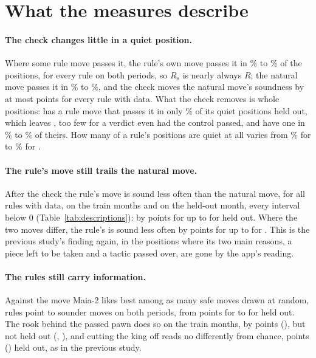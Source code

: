 \documentclass[11pt]{article}
\begin{document}
\ControlTable

\section{What the measures describe}

\paragraph{The check changes little in a quiet position.} Where some rule move passes it, the rule's
own move passes it in \RsRLow\% to \RsRHigh\% of the positions, for every rule on both periods, so
$R_s$ is nearly always $R$; the natural move passes it in \NsNLow\% to \NsNHigh\%, and the check moves
the natural move's soundness by at most \NaturalMax{} points for every rule with data. What the check
removes is whole positions: \ThinName{} has a rule move that passes it in only \ThinSafe\% of its
quiet positions held out, which leaves \ThinHeld{}, too few for a verdict even had the control
passed, and \LowSafeNames{} have one in \LowSafeLow\% to \LowSafeHigh\% of theirs. How many of a
rule's positions are quiet at all varies from \QuietLow\% for \QuietLowName{} to \QuietHigh\% for
\QuietHighName.

\paragraph{The rule's move still trails the natural move.} After the check the rule's move is sound
less often than the natural move, for all \NWith{} rules with data, on the train months and on the
held-out month, every interval below 0 (Table~\ref{tab:descriptions}): by \LiftLow{} points for
\LiftLowName{} up to \LiftHigh{} for \LiftHighName{} held out. Where the two moves differ, the rule's
is sound less often by \CondLow{} points for \CondLowName{} up to \CondHigh{} for \CondHighName. This
is the previous study's finding again, in the positions where its two main reasons, a piece left to
be taken and a tactic passed over, are gone by the app's reading.

\paragraph{The rules still carry information.} Against the move Maia-2 likes best among as many safe
moves drawn at random, \NContent{} rules point to sounder moves on both periods, from \ContentLow{}
points for \ContentLowName{} to \ContentHigh{} for \ContentHighName{} held out. The rook behind the
passed pawn does so on the train months, by \RbpContentTrain{} points (\RbpContentTrainCi), but not
held out (\RbpContentHeld, \RbpContentHeldCi), and cutting the king off reads no differently from
chance, \CutContentHeld{} points (\CutContentHeldCi) held out, as in the previous study.
\end{document}
